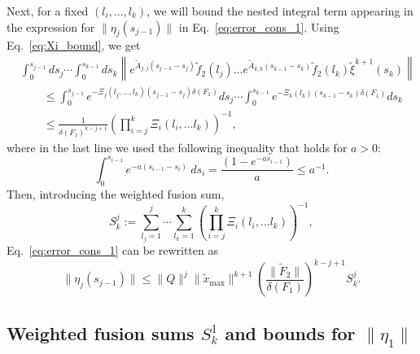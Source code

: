 \documentclass[superscriptaddress,onecolumn,nofootinbib,longbibliography,a4paper,accepted=2026-09-29]{quantumarticle}
\theoremstyle{plain}
\theoremstyle{definition}
\numberwithin{thm}{section}
\numberwithin{assumption}{section}
\numberwithin{lemma}{section}
\numberwithin{prop}{section}
\numberwithin{cor}{section}
\numberwithin{definition}{section}
\numberwithin{rmk}{section}
\numberwithin{equation}{section}
\begin{document}
Next, for a fixed $(l_i,\dots,l_k)$, we will bound the nested integral term appearing in the expression for $\|\eta_j(s_{j-1})\|$ in Eq.~\eqref{eq:error_cons_1}. Using Eq.~\eqref{eq:Xi_bound}, we get
\begin{align}
    &\int_{0}^{s_{j-1}} ds_{j} \cdots \int_{0}^{s_{k-1}} ds_k \left\| e^{\tilde{A}_{j,j}(s_{j-1}-s_{j})} \tilde{f}_2(l_j) \dots e^{\tilde{A}_{k,k}(s_{k-1}-s_k)} \tilde{f}_2(l_k) \tilde{\xi}^{k+1}(s_k)\right\| \\
     &\qquad \leq \int_{0}^{s_{j-1}} e^{-\Xi_j(l_j,\dots,l_k)(s_{j-1}-s_j)\delta(F_1)} ds_{j} \cdots \int_{0}^{s_{k-1}} e^{-\Xi_k(l_k)(s_{k-1}-s_k)\delta(F_1)} ds_k \\
     &\qquad \leq \frac{1}{\delta(F_1)^{k-j+1}} \left(\prod_{i=j}^k \Xi_i(l_i,\dots l_k)\right)^{-1},
\end{align}
where in the last line we used the following inequality that holds for $a>0$:
\begin{equation}
    \int_0^{s_{i-1}} e^{-a(s_{i-1}-s_i)} \ ds_{i} = \frac{\left(1-e^{-a s_{i-1}}\right)}{a} \leq a^{-1}.
\end{equation}
Then, introducing the weighted fusion sum,
\begin{equation}   
    \label{eq:fusion_sum}
    S^{j}_k := \sum_{l_j=1}^j\cdots \sum_{l_k=1}^k \left(\prod_{i=j}^k \Xi_i(l_i,\dots l_k)\right)^{-1},
\end{equation}
Eq.~\eqref{eq:error_cons_1} can be rewritten as
\begin{equation}
    \label{eq:error_cons_2}
    \|\eta_j(s_{j-1})\| \leq  \|Q\|^j \|\tilde{x}_{\mathrm{max}}\|^{k+1} \left(\frac{\|\tilde{F}_2\|}{\delta(F_1)}\right)^{k-j+1} S^{j}_k.
\end{equation}


\subsection{Weighted fusion sums\texorpdfstring{ $S_k^{1}$}{} and bounds for \texorpdfstring{$\|\eta_1\|$}{the first component of the Carleman error}}
\label{app:weighted_fusion_for_tree}
\end{document}
